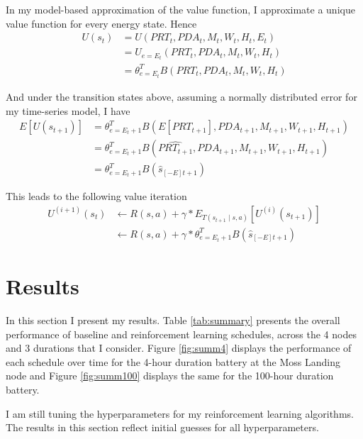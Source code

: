 \documentclass[conference]{IEEEtran}
\begin{document}
 In my model-based approximation of the value function, I approximate a unique value function for every energy state. Hence
 \begin{align*}
    U(s_t) &= U(PRT_t, PDA_t, M_t, W_t, H_t, E_t)\\
    &= U_{e = E_t}(PRT_t, PDA_t, M_t, W_t, H_t)\\
    &= \theta_{e = E_t}^T B(PRT_t, PDA_t, M_t, W_t, H_t)
 \end{align*}

 And under the transition states above, assuming a normally distributed error for my time-series model, I have
 \begin{align*}
    E[U(s_{t+1})] &= \theta_{e = E_t+1}^T B(E[PRT_{t+1}], PDA_{t+1}, M_{t+1}, W_{t+1}, H_{t+1})\\
    &= \theta_{e = E_t+1}^T B(\hat{PRT_{t+1}}, PDA_{t+1}, M_{t+1}, W_{t+1}, H_{t+1})\\
    &= \theta_{e = E_t+1}^T B(\hat{s}_{[-E]t+1})
 \end{align*}

 This leads to the following value iteration
 \begin{align*}
    U^{(i+1)}(s_t) &\leftarrow R(s,a) + \gamma * E_{T(s_{t+1}\mid s, a)}[U^{(i)}(s_{t+1})]\\
    &\leftarrow R(s,a) + \gamma * \theta_{e = E_t+1}^T B(\hat{s}_{[-E]t+1})
 \end{align*}


\section{Results \label{sec:results}}
In this section I present my results. Table \ref{tab:summary} presents the overall performance of baseline and reinforcement learning schedules, across the 4 nodes and 3 durations that I consider. Figure \ref{fig:summ4} displays the performance of each schedule over time for the 4-hour duration battery at the Moss Landing node and Figure \ref{fig:summ100} displays the same for the 100-hour duration battery.

I am still tuning the hyperparameters for my reinforcement learning algorithms. The results in this section reflect initial guesses for all hyperparameters.
\end{document}
